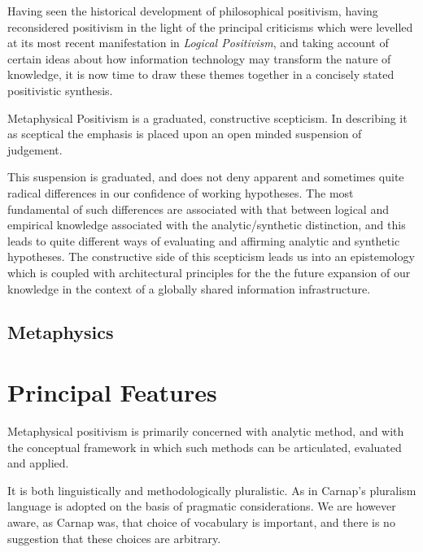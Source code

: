 Having seen the historical development of philosophical positivism,
having reconsidered positivism in the light of the principal
criticisms which were levelled at its most recent manifestation in
\emph{Logical Positivism}, and taking account of certain ideas
about how information technology may transform the nature of
knowledge, it is now time to draw these themes together in a concisely
stated positivistic synthesis.

Metaphysical Positivism is a graduated, constructive scepticism.
In describing it as sceptical the emphasis is placed upon an open
minded suspension of judgement.

This suspension is graduated, and does not deny apparent and
sometimes quite radical differences in our confidence of working
hypotheses.
The most fundamental of such differences are associated with that
between logical and empirical knowledge associated with the
analytic/synthetic distinction, and this leads to quite different ways
of evaluating and affirming analytic and synthetic hypotheses.
The constructive side of this scepticism leads us into an epistemology
which is coupled with architectural principles for the the future
expansion of our knowledge in the context of a globally shared
information infrastructure.

\subsection{Metaphysics}



\section{Principal Features}

Metaphysical positivism is primarily concerned with analytic method,
and with the conceptual framework in which such methods can be
articulated, evaluated and applied.

It is both linguistically and methodologically pluralistic.
As in Carnap's pluralism language is adopted on the basis of pragmatic
considerations.
We are however aware, as Carnap was, that choice of vocabulary is
important, and there is no suggestion that these choices are
arbitrary.

 
